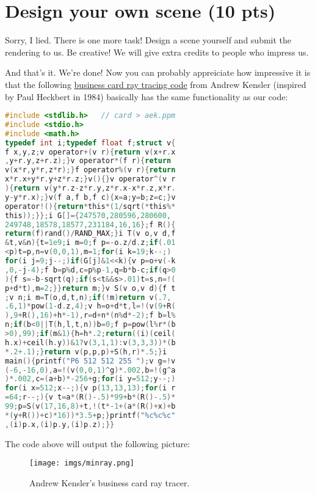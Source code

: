 \section{Design your own scene (10 pts)}
\label{sec:design_your_own}

Sorry, I lied. There is one more task! Design a scene yourself and submit the rendering to us. Be creative! We will give extra credits to people who impress us.

And that's it. We're done! Now you can probably appreiciate how impressive it is that the following \href{https://fabiensanglard.net/rayTracing_back_of_business_card/}{business card ray tracing code} from Andrew Kensler (inspired by Paul Heckbert in 1984) basically has the same functionality as our code:
\begin{lstlisting}[language=C]
#include <stdlib.h>   // card > aek.ppm
#include <stdio.h>
#include <math.h>
typedef int i;typedef float f;struct v{
f x,y,z;v operator+(v r){return v(x+r.x
,y+r.y,z+r.z);}v operator*(f r){return
v(x*r,y*r,z*r);}f operator%(v r){return
x*r.x+y*r.y+z*r.z;}v(){}v operator^(v r
){return v(y*r.z-z*r.y,z*r.x-x*r.z,x*r.
y-y*r.x);}v(f a,f b,f c){x=a;y=b;z=c;}v
operator!(){return*this*(1/sqrt(*this%*
this));}};i G[]={247570,280596,280600,
249748,18578,18577,231184,16,16};f R(){
return(f)rand()/RAND_MAX;}i T(v o,v d,f
&t,v&n){t=1e9;i m=0;f p=-o.z/d.z;if(.01
<p)t=p,n=v(0,0,1),m=1;for(i k=19;k--;)
for(i j=9;j--;)if(G[j]&1<<k){v p=o+v(-k
,0,-j-4);f b=p%d,c=p%p-1,q=b*b-c;if(q>0
){f s=-b-sqrt(q);if(s<t&&s>.01)t=s,n=!(
p+d*t),m=2;}}return m;}v S(v o,v d){f t
;v n;i m=T(o,d,t,n);if(!m)return v(.7,
.6,1)*pow(1-d.z,4);v h=o+d*t,l=!(v(9+R(
),9+R(),16)+h*-1),r=d+n*(n%d*-2);f b=l%
n;if(b<0||T(h,l,t,n))b=0;f p=pow(l%r*(b
>0),99);if(m&1){h=h*.2;return((i)(ceil(
h.x)+ceil(h.y))&1?v(3,1,1):v(3,3,3))*(b
*.2+.1);}return v(p,p,p)+S(h,r)*.5;}i
main(){printf("P6 512 512 255 ");v g=!v
(-6,-16,0),a=!(v(0,0,1)^g)*.002,b=!(g^a
)*.002,c=(a+b)*-256+g;for(i y=512;y--;)
for(i x=512;x--;){v p(13,13,13);for(i r
=64;r--;){v t=a*(R()-.5)*99+b*(R()-.5)*
99;p=S(v(17,16,8)+t,!(t*-1+(a*(R()+x)+b
*(y+R())+c)*16))*3.5+p;}printf("%c%c%c"
,(i)p.x,(i)p.y,(i)p.z);}}
\end{lstlisting}

The code above will output the following picture:
\begin{figure}
    \centering
    \texttt{[image: imgs/minray.png]}
    \caption{Andrew Kensler's business card ray tracer.}
    \label{fig:business_card}
\end{figure}


